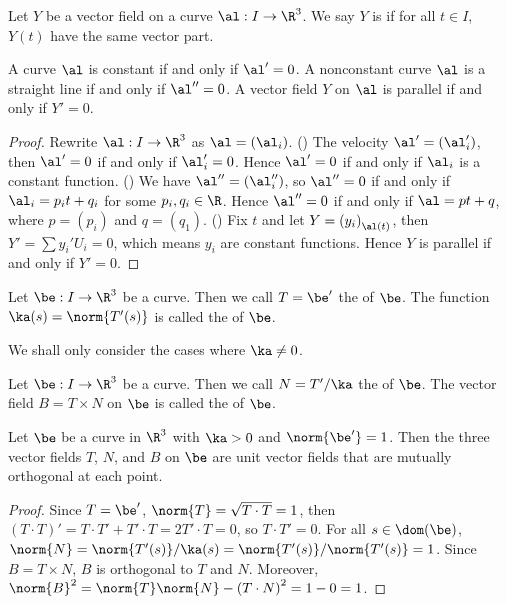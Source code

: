 \documentclass[10pt]{article}
\begin{document}
\begin{definition}
    Let $Y$ be a vector field on a curve $\al:I\to{\R}^{3}$. We say $Y$ is  if for all $t\in I$, $Y(t)$ have the same vector part.
\end{definition}
\begin{proposition}
    A curve $\al$ is constant if and only if $\al'=0$. A nonconstant curve $\al$ is a straight line if and only if $\al''=0$. A vector field $Y$ on $\al$ is parallel if and only if $Y'=0$.
\end{proposition}
\begin{proof}
    Rewrite $\al:I\to{\R}^{3}$ as $\al=({\al}_{i})$. () The velocity $\al'=({\al}_{i}')$, then $\al'=0$ if and only if ${\al}_{i}'=0$. Hence $\al'=0$ if and only if ${\al}_{i}$ is a constant function. () We have $\al''=({\al}_{i}'')$, so $\al''=0$ if and only if ${\al}_{i}={p}_{i}t+{q}_{i}$ for some ${p}_{i},{q}_{i}\in\R$. Hence $\al''=0$ if and only if $\al=pt+q$, where $p=({p}_{i})$ and $q=({q}_{1})$. () Fix $t$ and let $Y={({y}_{i})}_{\al(t)}$, then $Y'=\sum{y}_{i}'{U}_{i}=0$, which means ${y}_{i}$ are constant functions. Hence $Y$ is parallel if and only if $Y'=0$.
\end{proof}
\begin{definition}
    Let $\be:I\to{\R}^{3}$ be a curve. Then we call $T=\be'$ the  of $\be$. The function $\ka(s)=\norm{T'(s)}$ is called the  of $\be$. 
\end{definition}
\begin{remark}
    We shall only consider the cases where $\ka\ne 0$.
\end{remark}
\begin{definition}
    Let $\be:I\to{\R}^{3}$ be a curve. Then we call $N=T'/\ka$ the  of $\be$. The vector field $B=T\times N$ on $\be$ is called the  of $\be$.
\end{definition}
\begin{proposition}
    Let $\be$ be a curve in ${\R}^{3}$ with $\ka>0$ and $\norm{\be'}=1$. Then the three vector fields $T$, $N$, and $B$ on $\be$ are unit vector fields that are mutually orthogonal at each point.
\end{proposition}
\begin{proof}
    Since $T=\be'$, $\norm{T}=\sqrt{T\cdot T}=1$, then $(T\cdot T)'=T\cdot T'+T'\cdot T=2T'\cdot T=0$, so $T\cdot T'=0$. For all $s\in\dom(\be)$, $\norm{N}=\norm{T'(s)}/\ka(s)=\norm{T'(s)}/\norm{T'(s)}=1$. Since $B=T\times N$, $B$ is orthogonal to $T$ and $N$. Moreover, ${\norm{B}}^{2}=\norm{T}\norm{N}-{(T\cdot N)}^{2}=1-0=1$.
\end{proof}
\end{document}
